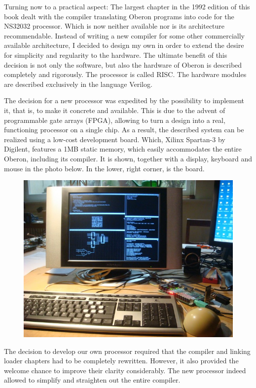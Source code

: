 Turning now to a practical aspect: The largest chapter in the 1992 edition of this book dealt with the
compiler translating Oberon programs into code for the NS32032 processor. Which is now
neither available nor is its architecture recommendable. Instead of writing a new compiler for some
other commercially available architecture, I decided to design my own in order to extend the desire
for simplicity and regularity to the hardware. The ultimate benefit of this decision is not only the
software, but also the hardware of Oberon is described completely and rigorously. The
processor is called RISC. The hardware modules are described exclusively in the language Verilog.

The decision for a new processor was expedited by the possibility to implement it, that is, to make it
concrete and available. This is due to the advent of programmable gate arrays (FPGA), allowing to turn
a design into a real, functioning processor on a single chip. As a result, the described system can be
realized using a low-cost development board. Which, Xilinx Spartan-3 by Digilent, features a 1MB static
memory, which easily accommodates the entire Oberon, including its compiler. It is shown, together with
a display, keyboard and mouse in the photo below. In the lower, right corner, is the board.
\begin{figure}[h!]
  \centering
  \includegraphics[width=.8\textwidth]{i/0}
\end{figure}

The decision to develop our own processor required that the compiler and linking loader chapters
had to be completely rewritten. However, it also provided the welcome chance to
improve their clarity considerably. The new processor indeed allowed to simplify and straighten out the entire compiler.

